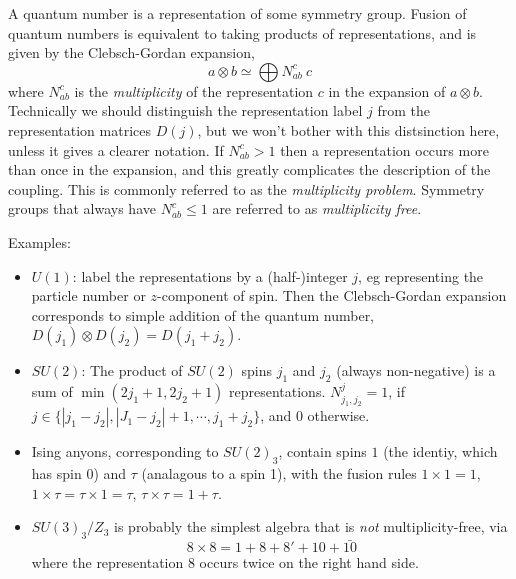 \documentclass[12pt]{article}
\begin{document}
A quantum number is a representation of some symmetry group. Fusion of quantum
numbers is equivalent to taking products of representations, and is given by
the Clebsch-Gordan expansion,
\begin{equation}
a \otimes b \simeq \bigoplus N^{c}_{ab} \: c
\end{equation}
where $N^{c}_{ab}$ is the \emph{multiplicity} of the representation $c$ in the expansion
of $a \otimes b$.
Technically we should distinguish the representation label $j$ from the representation
matrices $D(j)$, but we won't bother with this distsinction here, unless it gives a clearer
notation.
If $N^{c}_{ab} > 1$ then a representation occurs more than once in the expansion,
and this greatly complicates the description of the coupling. This is commonly
referred to as the \emph{multiplicity problem}. Symmetry groups that always have 
$N^{c}_{ab} \leq 1$ are referred to as \emph{multiplicity free}.

Examples:
\begin{itemize}
\item $U(1)$: label the representations by a (half-)integer $j$, eg representing
the particle number or $z$-component of spin. Then the Clebsch-Gordan
expansion corresponds to simple addition of the quantum number, $D(j_1) \otimes D(j_2) = D(j_1+j_2)$.
\item $SU(2)$: The product of $SU(2)$ spins $j_1$ and $j_2$ (always non-negative) 
is a sum of $\min(2j_1+1,2j_2+1)$
representations. $N^{j}_{j_1,j_2} = 1$, if 
$j \in \{|j_1 - j_2|, |J_1 - j_2| + 1, \cdots, j_1+j_2\}$,
and $0$ otherwise.
\item Ising anyons, corresponding to $SU(2)_3$, contain spins $1$ (the identiy,
which has spin 0) and $\tau$ (analagous to a spin 1), with the
fusion rules $1 \times 1 = 1$, $1 \times \tau = \tau \times 1 = \tau$, $\tau \times \tau = 1 + \tau$.
\item $SU(3)_3 / Z_3$ is probably the simplest algebra that is \emph{not} 
multiplicity-free\cite{Ardonne}, via
\begin{equation}
8 \times 8 = 1 + 8 + 8' + 10 + \bar{10}
\end{equation}
where the representation $8$ occurs twice on the right hand side.

\end{itemize}
\end{document}
